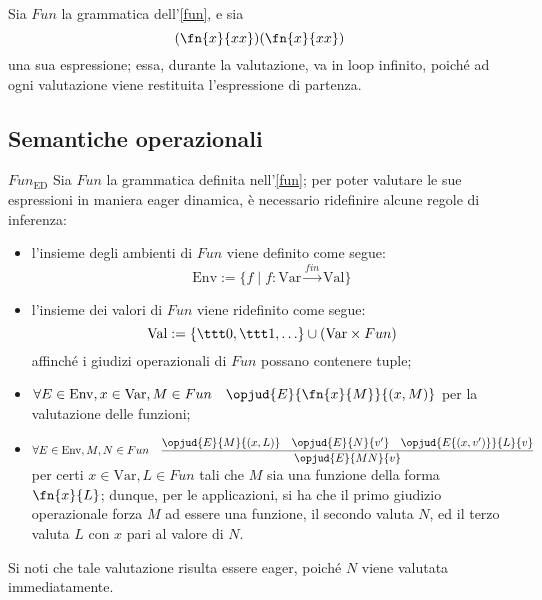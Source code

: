 \documentclass[a4paper, 12pt]{report}
\begin{document}
    \begin{example}[Curryficazioni]
        Sia $Fun$ la grammatica dell'\cref{fun}, e sia $$(\fn{x}{xx})(\fn{x}{xx})$$ una sua espressione; essa, durante la valutazione, va in loop infinito, poiché ad ogni valutazione viene restituita l'espressione di partenza.
    \end{example}

    \subsection{Semantiche operazionali}

    \begin{framedobs}{$Fun_\mathrm{ED}$}
        Sia $Fun$ la grammatica definita nell'\cref{fun}; per poter valutare le sue espressioni in maniera eager dinamica, è necessario ridefinire alcune regole di inferenza:

        \begin{itemize}
            \item l'insieme degli ambienti di $Fun$ viene definito come segue: $$\mathrm{Env} := \{f \mid f : \mathrm{Var} \xrightarrow{fin} \mathrm{Val}\}$$
            \item l'insieme dei valori di $Fun$ viene ridefinito come segue: $$\mathrm{Val} := \{ \ttt 0, \ttt 1 , \ldots \} \cup (\mathrm{Var} \times Fun)$$ affinché i giudizi operazionali di $Fun$ possano contenere tuple;
            \item $\forall E \in \mathrm{Env}, x \in \mathrm{Var}, M \in Fun \quad \opjud{E}{\fn{x}{M}}{(x,M)}$ per la valutazione delle funzioni;
            \item $\forall E \in \mathrm{Env}, M,N \in Fun \quad \dfrac{\opjud{E}{M}{(x,L)} \quad \opjud{E}{N}{v'} \quad \opjud{E\{(x,v')\}}{L}{v}}{\opjud{E}{MN}{v}}$ per certi $x \in \mathrm{Var}, L \in Fun$ tali che $M$ sia una funzione della forma $\fn{x}{L}$; dunque, per le applicazioni, si ha che il primo giudizio operazionale forza $M$ ad essere una funzione, il secondo valuta $N$, ed il terzo valuta $L$ con $x$ pari al valore di $N$.
        \end{itemize}

        Si noti che tale valutazione risulta essere eager, poiché $N$ viene valutata immediatamente.
    \end{framedobs}
\end{document}
